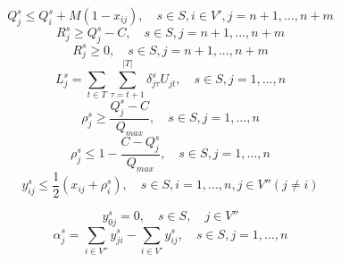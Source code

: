 \documentclass[authoryear,preprint,12pt]{elsarticle}
\begin{document}
%
\begin{equation}\label{c9.1}
    Q_j^s \leq Q_i^s + M(1-x_{ij}), \quad s \in S, i\in V', j=n+1,...,n+m 
\end{equation}
%
\begin{equation}\label{c10}
  R_j^s\geq Q_j^s - C , \quad s \in S, j=n+1,...,n+m 
\end{equation}
%
\begin{equation}\label{c11}
  R_j^s\geq 0, \quad s \in S, j=n+1,...,n+m 
\end{equation}
%
\begin{equation}\label{c12}
  L_j^s=\sum_{t\in T}\sum_{\tau=t+1}^{|T|}\delta_{j\tau}^sU_{jt}, \quad s \in S, j=1,...,n 
\end{equation}
%
\begin{equation}\label{c13}
\rho_j^s \geq \frac{Q_j^s-C}{Q_{max}}, \quad s \in S, j = 1, \ldots , n  
\end{equation}
%
\begin{equation}\label{c14}
\rho_j^s \leq 1-\frac{C-Q_j^s}{Q_{max}}, \quad s \in S, j = 1, \ldots ,n 
\end{equation}
%
\begin{equation}\label{c15}
 y_{ij}^s \leq \frac{1}{2}(x_{ij}+\rho_i^s), \quad s \in S, i=1,...,n, j \in V'' (j \neq i)
\end{equation}
%

%
\begin{equation} \label{cy}
y_{0j}^s = 0, \quad s \in S, \quad j \in V''
\end{equation}
%
\begin{equation} \label{cyalpha}
\alpha_j^s = \sum_{i \in V''}y_{ji}^s - \sum_{i \in V'}y_{ij}^s, \quad s \in S, j = 1, \ldots, n
\end{equation}   
\end{document}
